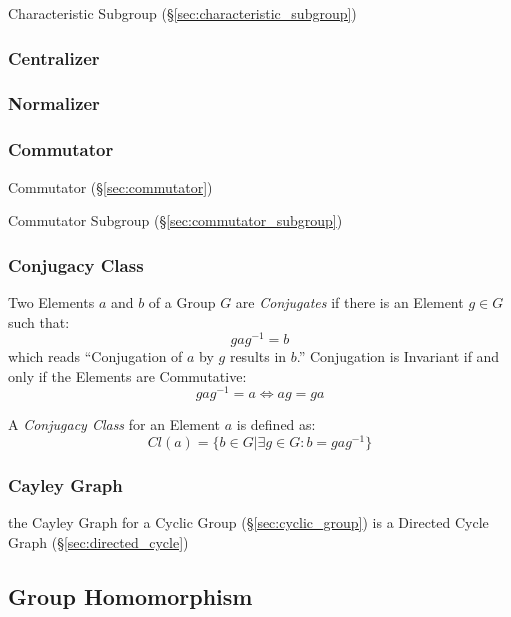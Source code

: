 Characteristic Subgroup (\S\ref{sec:characteristic_subgroup})



\subsubsection{Centralizer}\label{sec:group_centralizer}

\subsubsection{Normalizer}\label{sec:group_normalizer}

\subsubsection{Commutator}\label{sec:group_commutator}

Commutator (\S\ref{sec:commutator})

Commutator Subgroup (\S\ref{sec:commutator_subgroup})



\subsubsection{Conjugacy Class}\label{sec:conjugacy_class}

Two Elements $a$ and $b$ of a Group $G$ are \emph{Conjugates} if there
is an Element $g \in G$ such that:
\[
    gag^{-1} = b
\]
which reads ``Conjugation of $a$ by $g$ results in $b$.'' Conjugation
is Invariant if and only if the Elements are Commutative:
\[
    gag^{-1} = a \Leftrightarrow ag = ga
\]

A \emph{Conjugacy Class} for an Element $a$ is defined as:
\[
    Cl(a) = \{ b \in G | \exists g \in G : b = gag^{-1}\}
\]



\subsubsection{Cayley Graph}\label{sec:cayley_graph}

the Cayley Graph for a Cyclic Group (\S\ref{sec:cyclic_group}) is a
Directed Cycle Graph (\S\ref{sec:directed_cycle})



\subsection{Group Homomorphism}\label{sec:group_homomorphism}

